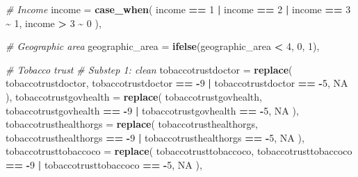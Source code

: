 \documentclass[
]{article}
\newenvironment{Shaded}{\begin{snugshade}}{\end{snugshade}}
\newcommand{\AttributeTok}[1]{\textcolor[rgb]{0.13,0.29,0.53}{#1}}
\newcommand{\CommentTok}[1]{\textcolor[rgb]{0.56,0.35,0.01}{\textit{#1}}}
\newcommand{\ConstantTok}[1]{\textcolor[rgb]{0.56,0.35,0.01}{#1}}
\newcommand{\DecValTok}[1]{\textcolor[rgb]{0.00,0.00,0.81}{#1}}
\newcommand{\FunctionTok}[1]{\textcolor[rgb]{0.13,0.29,0.53}{\textbf{#1}}}
\newcommand{\NormalTok}[1]{#1}
\newcommand{\SpecialCharTok}[1]{\textcolor[rgb]{0.81,0.36,0.00}{\textbf{#1}}}
\begin{document}
\begin{Shaded}
\begin{Highlighting}[]
    \CommentTok{\# Income}
    \AttributeTok{income =} \FunctionTok{case\_when}\NormalTok{(}
\NormalTok{      income }\SpecialCharTok{==} \DecValTok{1} \SpecialCharTok{|}\NormalTok{ income }\SpecialCharTok{==} \DecValTok{2} \SpecialCharTok{|}\NormalTok{ income }\SpecialCharTok{==} \DecValTok{3} \SpecialCharTok{\textasciitilde{}} \DecValTok{1}\NormalTok{,}
\NormalTok{      income }\SpecialCharTok{\textgreater{}} \DecValTok{3} \SpecialCharTok{\textasciitilde{}} \DecValTok{0}
\NormalTok{    ),}
    
    \CommentTok{\# Geographic area}
    \AttributeTok{geographic\_area =} \FunctionTok{ifelse}\NormalTok{(geographic\_area }\SpecialCharTok{\textless{}} \DecValTok{4}\NormalTok{, }\DecValTok{0}\NormalTok{, }\DecValTok{1}\NormalTok{),}
    
    \CommentTok{\# Tobacco trust}
    \CommentTok{\# Substep 1: clean}
    \AttributeTok{tobaccotrustdoctor =} \FunctionTok{replace}\NormalTok{(}
\NormalTok{      tobaccotrustdoctor,}
\NormalTok{      tobaccotrustdoctor }\SpecialCharTok{==} \SpecialCharTok{{-}}\DecValTok{9} \SpecialCharTok{|}\NormalTok{ tobaccotrustdoctor }\SpecialCharTok{==} \SpecialCharTok{{-}}\DecValTok{5}\NormalTok{,}
      \ConstantTok{NA}
\NormalTok{      ),}
    \AttributeTok{tobaccotrustgovhealth =} \FunctionTok{replace}\NormalTok{(}
\NormalTok{      tobaccotrustgovhealth,}
\NormalTok{      tobaccotrustgovhealth }\SpecialCharTok{==} \SpecialCharTok{{-}}\DecValTok{9} \SpecialCharTok{|}\NormalTok{ tobaccotrustgovhealth }\SpecialCharTok{==} \SpecialCharTok{{-}}\DecValTok{5}\NormalTok{,}
      \ConstantTok{NA}
\NormalTok{      ),}
    \AttributeTok{tobaccotrusthealthorgs =} \FunctionTok{replace}\NormalTok{(}
\NormalTok{      tobaccotrusthealthorgs,}
\NormalTok{      tobaccotrusthealthorgs }\SpecialCharTok{==} \SpecialCharTok{{-}}\DecValTok{9} \SpecialCharTok{|}\NormalTok{ tobaccotrusthealthorgs }\SpecialCharTok{==} \SpecialCharTok{{-}}\DecValTok{5}\NormalTok{,}
      \ConstantTok{NA}
\NormalTok{      ),}
    \AttributeTok{tobaccotrusttobaccoco =} \FunctionTok{replace}\NormalTok{(}
\NormalTok{      tobaccotrusttobaccoco,}
\NormalTok{      tobaccotrusttobaccoco }\SpecialCharTok{==} \SpecialCharTok{{-}}\DecValTok{9} \SpecialCharTok{|}\NormalTok{ tobaccotrusttobaccoco }\SpecialCharTok{==} \SpecialCharTok{{-}}\DecValTok{5}\NormalTok{,}
      \ConstantTok{NA}
\NormalTok{      ),}
    

\end{Highlighting}
\end{Shaded}
\end{document}
